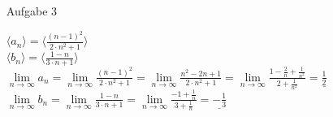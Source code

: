 \documentclass{scrreprt}
\begin{document}
\begin{enumerate}
{\begin{enumerate}
{                }
            \end{enumerate}
        }
        \newpage
        \item[Aufgabe 3]{
            $\langle a_n\rangle = \langle \frac{(n-1)^2}{2\cdot n^2 + 1}\rangle$\\
            $\langle b_n\rangle = \langle \frac{1-n}{3\cdot n + 1}\rangle$\\
            $\lim \limits_{n \to \infty} a_n =
            \lim \limits_{n \to \infty} \frac{(n-1)^2}{2\cdot n^2 + 1} =
            \lim \limits_{n \to \infty} \frac{n^2-2n+1}{2\cdot n^2 + 1} =
            \lim \limits_{n \to \infty} \frac{1-\frac{2}{n}+\frac{1}{n^2}}{2 + \frac{1}{n^2}} =
            \underline{\frac{1}{2}}$\\
            $\lim \limits_{n \to \infty} b_n =
            \lim \limits_{n \to \infty} \frac{1-n}{3\cdot n + 1} =
            \lim \limits_{n \to \infty} \frac{-1+ \frac{1}{n}}{3 + \frac{1}{n}} =
            \underline{-\frac{1}{3}}$

}
\end{enumerate}
\end{document}
